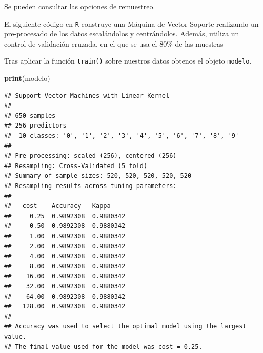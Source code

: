 \documentclass[12pt,spanish,a4paper]{article}
\newenvironment{Shaded}{\begin{snugshade}}{\end{snugshade}}
\newcommand{\KeywordTok}[1]{\textcolor[rgb]{0.13,0.29,0.53}{\textbf{#1}}}
\newcommand{\DataTypeTok}[1]{\textcolor[rgb]{0.13,0.29,0.53}{#1}}
\newcommand{\DecValTok}[1]{\textcolor[rgb]{0.00,0.00,0.81}{#1}}
\newcommand{\FloatTok}[1]{\textcolor[rgb]{0.00,0.00,0.81}{#1}}
\newcommand{\StringTok}[1]{\textcolor[rgb]{0.31,0.60,0.02}{#1}}
\newcommand{\OtherTok}[1]{\textcolor[rgb]{0.56,0.35,0.01}{#1}}
\newcommand{\OperatorTok}[1]{\textcolor[rgb]{0.81,0.36,0.00}{\textbf{#1}}}
\newcommand{\NormalTok}[1]{#1}
\numberwithin{equation}{section}
\begin{document}
Se pueden consultar las opciones de
\href{http://topepo.github.io/caret/subsampling-for-class-imbalances.html}{remuestreo}.

El siguiente código en \texttt{R} construye una Máquina de Vector
Soporte realizando un pre-procesado de los datos escalándolos y
centrándolos. Además, utiliza un control de validación cruzada, en el
que se usa el 80\% de las muestras

\begin{Shaded}
\end{Shaded}

Tras aplicar la función \texttt{train()} sobre nuestros datos obtenos el
objeto \texttt{modelo}.

\begin{Shaded}
\begin{Highlighting}[]
\KeywordTok{print}\NormalTok{(modelo)}
\end{Highlighting}
\end{Shaded}

\begin{verbatim}
## Support Vector Machines with Linear Kernel 
## 
## 650 samples
## 256 predictors
##  10 classes: '0', '1', '2', '3', '4', '5', '6', '7', '8', '9' 
## 
## Pre-processing: scaled (256), centered (256) 
## Resampling: Cross-Validated (5 fold) 
## Summary of sample sizes: 520, 520, 520, 520, 520 
## Resampling results across tuning parameters:
## 
##   cost    Accuracy   Kappa    
##     0.25  0.9892308  0.9880342
##     0.50  0.9892308  0.9880342
##     1.00  0.9892308  0.9880342
##     2.00  0.9892308  0.9880342
##     4.00  0.9892308  0.9880342
##     8.00  0.9892308  0.9880342
##    16.00  0.9892308  0.9880342
##    32.00  0.9892308  0.9880342
##    64.00  0.9892308  0.9880342
##   128.00  0.9892308  0.9880342
## 
## Accuracy was used to select the optimal model using the largest value.
## The final value used for the model was cost = 0.25.
\end{verbatim}
\end{document}
